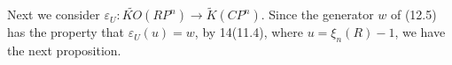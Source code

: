 Next we consider $\varepsilon_U: \tilde{KO}(RP^n) \rightarrow \tilde{K}(CP^n)$. Since the generator $w$ of (12.5) has the property that $\varepsilon_U(u) = w$, by 14(11.4), where $u = \xi_n(R) - 1$, we have the next proposition.
